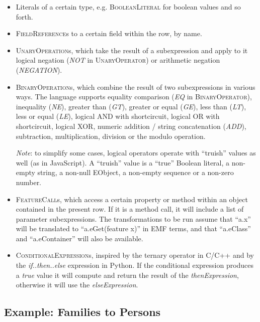 \documentclass[a4paper]{scrartcl}
\newcommand*{\class}[1]{\textsc{#1}}
\begin{document}
\begin{itemize}
\item Literals of a certain type, e.g. \class{BooleanLiteral} for
  boolean values and so forth.

\item \class{FieldReference}s to a certain field within the row, by
  name.

\item \class{UnaryOperation}s, which take the result of a
  subexpression and apply to it logical negation (\emph{NOT} in
  \class{UnaryOperator}) or arithmetic negation (\emph{NEGATION}).

\item \class{BinaryOperation}s, which combine the result of two
  subexpressions in various ways. The language supports equality
  comparison (\emph{EQ} in \class{BinaryOperator}), inequality
  (\emph{NE}), greater than (\emph{GT}), greater or equal (\emph{GE}),
  less than (\emph{LT}), less or equal (\emph{LE}), logical AND with
  shortcircuit, logical OR with shortcircuit, logical XOR, numeric
  addition / string concatenation (\emph{ADD}), subtraction,
  multiplication, division or the modulo operation.

  \emph{Note}: to simplify some cases, logical operators operate with
  ``truish'' values as well (as in JavaScript). A ``truish'' value is
  a ``true'' Boolean literal, a non-empty string, a non-null EObject,
  a non-empty sequence or a non-zero number.

\item \class{FeatureCall}s, which access a certain property or method
  within an object contained in the present row. If it is a method
  call, it will include a list of parameter subexpressions. The
  transformations to be run assume that ``a.x'' will be translated to
  ``a.eGet(feature x)'' in EMF terms, and that ``a.eClass'' and
  ``a.eContainer'' will also be available.

\item \class{ConditionalExpression}s, inspired by the ternary operator
  in C/C++ and by the \emph{if..then..else} expression in Python. If
  the conditional expression produces a \emph{true} value it will
  compute and return the result of the \emph{thenExpression},
  otherwise it will use the \emph{elseExpression}.
\end{itemize}

\subsection{Example: Families to Persons}
\label{sec:f2p}
\end{document}
